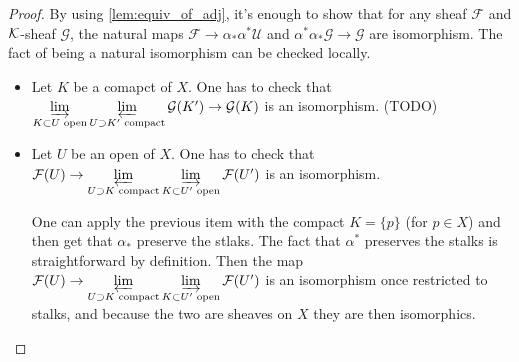 \begin{proof}
    By using \ref{lem:equiv_of_adj}, it's enough to show that for any sheaf $\mathcal{F}$ and $\mathcal{K}$-sheaf $\mathcal{G}$, the natural maps $\mathcal{F}\to \alpha_*\alpha^*\mathcal{U}$ and $\alpha^*\alpha_*\mathcal{G}\to \mathcal{G}$ are isomorphism. The fact of being a natural isomorphism can be checked locally.\begin{itemize}

        \item Let $K$ be a comapct of $X$. One has to check that $\varinjlim\limits_{K\subset U \text{ open}}\varprojlim\limits_{U\supset K' \text{ compact}}\mathcal{G}(K')\to \mathcal{G}(K)$ is an isomorphism. (TODO) %

        \item Let $U$ be an open of $X$. One has to check that $\mathcal{F}(U)\to \varprojlim\limits_{U\supset K \text{ compact}}\varinjlim\limits_{K\subset U' \text{ open}}\mathcal{F}(U')$ is an isomorphism.

        One can apply the previous item with the compact $K=\{p\}$ (for $p\in X$) and then get that $\alpha_*$ preserve the stlaks. The fact that $\alpha^*$ preserves the stalks is straightforward by definition. Then the map $\mathcal{F}(U)\to \varprojlim\limits_{U\supset K \text{ compact}}\varinjlim\limits_{K\subset U' \text{ open}}\mathcal{F}(U')$ is an isomorphism once restricted to stalks, and because the two are sheaves on $X$ they are then isomorphics.
    \end{itemize}
\end{proof}